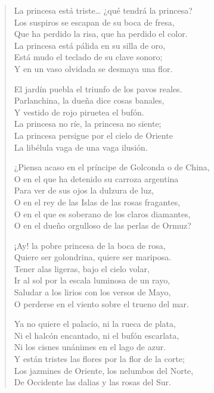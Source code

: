 \documentclass[12pt]{article}
\begin{document}
\clearpage
{}
\begin{verse}

La princesa está triste\ldots{} ¿qué tendrá la princesa?\\
Los suspiros se escapan de su boca de fresa,\\
Que ha perdido la risa, que ha perdido el color.\\
La princesa está pálida en su silla de oro,\\
Está mudo el teclado de su clave sonoro;\\
Y en un vaso olvidada se desmaya una flor.  

El jardín puebla el triunfo de los pavos reales.\\
Parlanchina, la dueña dice cosas banales,\\
Y vestido de rojo piruetea el bufón.\\
La princesa no ríe, la princesa no siente;\\
La princesa persigue por el cielo de Oriente\\
La libélula vaga de una vaga ilusión.  

¿Piensa acaso en el príncipe de Golconda o de China,\\
O en el que ha detenido su carroza argentina\\
Para ver de sus ojos la dulzura de luz,\\
O en el rey de las Islas de las rosas fragantes,\\
O en el que es soberano de los claros diamantes,\\
O en el dueño orgulloso de las perlas de Ormuz?  

¡Ay! la pobre princesa de la boca de rosa,\\
Quiere ser golondrina, quiere ser mariposa.\\
Tener alas ligeras, bajo el cielo volar,\\
Ir al sol por la escala luminosa de un rayo,\\
Saludar a los lirios con los versos de Mayo,\\
O perderse en el viento sobre el trueno del mar.  

Ya no quiere el palacio, ni la rueca de plata,\\
Ni el halcón encantado, ni el bufón escarlata,\\
Ni los cisnes unánimes en el lago de azur.\\
Y están tristes las flores por la flor de la corte;\\
Los jazmines de Oriente, los nelumbos del Norte,\\
De Occidente las dalias y las rosas del Sur.  


\end{verse}
\end{document}
